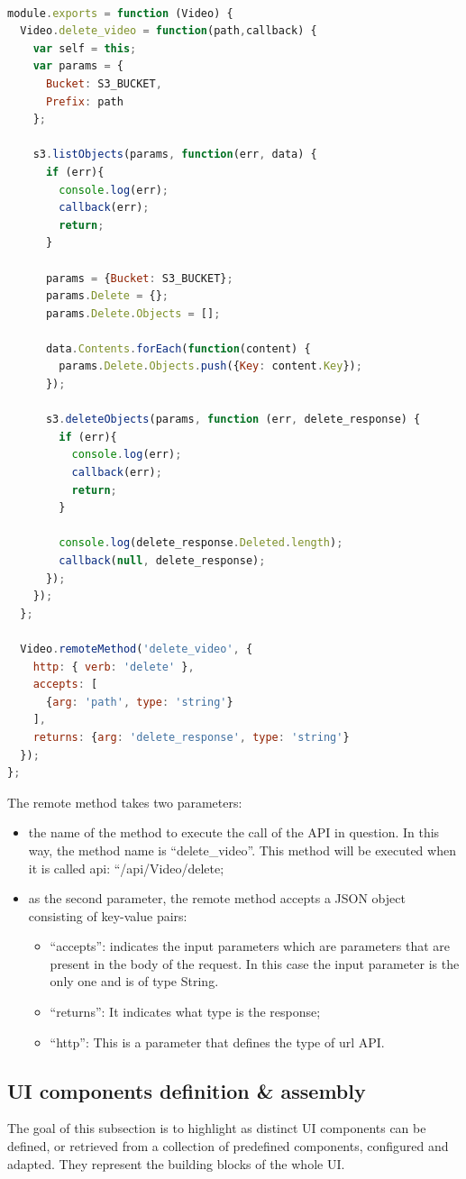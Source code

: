 \begin{lstlisting}[language=javascript]

module.exports = function (Video) {
  Video.delete_video = function(path,callback) {
    var self = this;
    var params = {
      Bucket: S3_BUCKET,
      Prefix: path
    };

    s3.listObjects(params, function(err, data) {
      if (err){
        console.log(err);
        callback(err);
        return;
      } 

      params = {Bucket: S3_BUCKET};
      params.Delete = {};
      params.Delete.Objects = [];

      data.Contents.forEach(function(content) {
        params.Delete.Objects.push({Key: content.Key});
      });

      s3.deleteObjects(params, function (err, delete_response) {
        if (err){
          console.log(err);
          callback(err);
          return;
        }

        console.log(delete_response.Deleted.length);
        callback(null, delete_response);
      });
    });
  };

  Video.remoteMethod('delete_video', {
    http: { verb: 'delete' },
    accepts: [
      {arg: 'path', type: 'string'}
    ],
    returns: {arg: 'delete_response', type: 'string'}
  });
};
\end{lstlisting}

The remote method takes two parameters:
\begin{itemize}
\item the name of the method to execute the call of the API in question. In this way, the method name is “delete\_video”. This method will be executed when it is called api: “/api/Video/delete;
\item as the second parameter, the remote method accepts a JSON object consisting of key-value pairs:
  \begin{itemize}
    \item “accepts”: indicates the input parameters which are parameters that are present in the body of the request. In this case the input parameter is the only one and is of type String.
    \item “returns”: It indicates what type is the response;
    \item “http”: This is a parameter that defines the type of url API.
  \end{itemize}
\end{itemize}


\subsection {UI components definition \& assembly}
\label{subsec:components_definition}
The goal of this subsection is to highlight as distinct UI components can be defined, or retrieved from a collection of predefined components, configured and adapted. They represent the building blocks of the whole UI.

